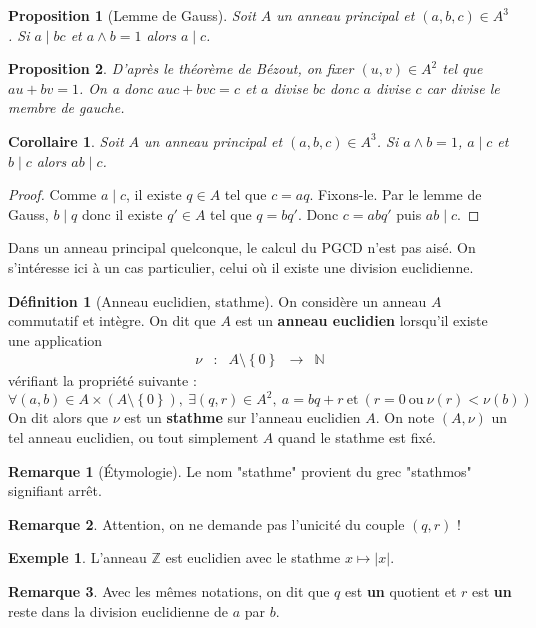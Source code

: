 \documentclass[french]{book}
\newcommand{\N}{\mathbb{N}}
\newcommand{\Z}{\mathbb{Z}}
\theoremstyle{plain}
\newtheorem{prop}{Proposition}[chapter]
\newtheorem{cor}{Corollaire}[chapter]
\theoremstyle{definition}
\newtheorem{dfn}{Définition}[chapter]
\newtheorem{exa}{Exemple}[chapter]
\newtheorem{rmq}{Remarque}[chapter]
\theoremstyle{remark}
\begin{document}
\begin{prop}[Lemme de Gauss]
	Soit $A$ un anneau principal et $(a,b,c)\in A^3$. Si $a\mid bc$ et $a\wedge b=1$ alors $a\mid c$.
\end{prop}
\begin{prop}
	D'après le théorème de Bézout, on fixer $(u,v)\in A^2$ tel que $au+bv=1$. On a donc $auc+bvc=c$ et $a$ divise $bc$ donc $a$ divise $c$ car divise le membre de gauche.
\end{prop}
\begin{cor}
	Soit $A$ un anneau principal et $(a,b,c)\in A^3$. Si $a\wedge b=1$, $a\mid c$ et $b\mid c$ alors $ab\mid c$. 
\end{cor}
\begin{proof}
	Comme $a\mid c$, il existe $q\in A$ tel que $c=aq$. Fixons-le. Par le lemme de Gauss, $b\mid q$ donc il existe $q'\in A$ tel que $q=bq'$. Donc $c=abq'$ puis $ab\mid c$.
\end{proof}
Dans un anneau principal quelconque, le calcul du PGCD n'est pas aisé. On s'intéresse ici à un cas particulier, celui où il existe une division euclidienne.
\begin{dfn}[Anneau euclidien, stathme]
	On considère un anneau $A$ commutatif et intègre. On dit que $A$ est un \textbf{anneau euclidien} lorsqu'il existe une application $$\begin{array}{ccccc}\nu&:&A\setminus\left\{0\right\}&\rightarrow&\N\end{array}$$vérifiant la propriété suivante : $$\forall (a,b)\in A\times(A\setminus\left\{0\right\}),\ \exists(q,r)\in A^2,\ a=bq+r\ \text{et}\ \left(r=0\ \text{ou}\ \nu(r)<\nu(b)\right)$$ On dit alors que $\nu$ est un \textbf{stathme} sur l'anneau euclidien $A$. On note $(A,\nu)$ un tel anneau euclidien, ou tout simplement $A$ quand le stathme est fixé.
\end{dfn}
\begin{rmq}[Étymologie]
	Le nom "stathme" provient du grec "stathmos" signifiant arrêt.
\end{rmq}
\begin{rmq}
	Attention, on ne demande pas l'unicité du couple $(q,r)$ !
\end{rmq}
\begin{exa}
	L'anneau $\Z$ est euclidien avec le stathme $x\mapsto \lvert x\rvert$.
\end{exa}
\begin{rmq}
	Avec les mêmes notations, on dit que $q$ est \textbf{un} quotient et $r$ est \textbf{un} reste dans la division euclidienne de $a$ par $b$.
\end{rmq}
\end{document}

